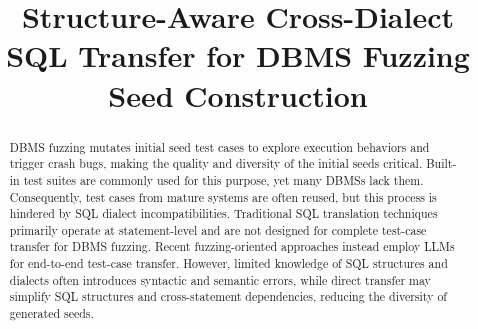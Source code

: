 \documentclass[conference]{IEEEtran}
\newcommand{\tool}{\textsc{Morph}\xspace}
\begin{document}
\title{Structure-Aware Cross-Dialect SQL Transfer for DBMS Fuzzing Seed Construction}


\maketitle

\begin{abstract}

DBMS fuzzing mutates initial seed test cases to explore execution behaviors and trigger crash bugs, making the quality and diversity of the initial seeds critical.
Built-in test suites are commonly used for this purpose, yet many DBMSs lack them.
Consequently, test cases from mature systems are often reused, but this process is hindered by SQL dialect incompatibilities.
Traditional SQL translation techniques primarily operate at statement-level and are not designed for complete test-case transfer for DBMS fuzzing.
Recent fuzzing-oriented approaches instead employ LLMs for end-to-end test-case transfer.
However, limited knowledge of SQL structures and dialects often introduces syntactic and semantic errors, while direct transfer may simplify SQL structures and cross-statement dependencies, reducing the diversity of generated seeds.


\end{abstract}
\end{document}
